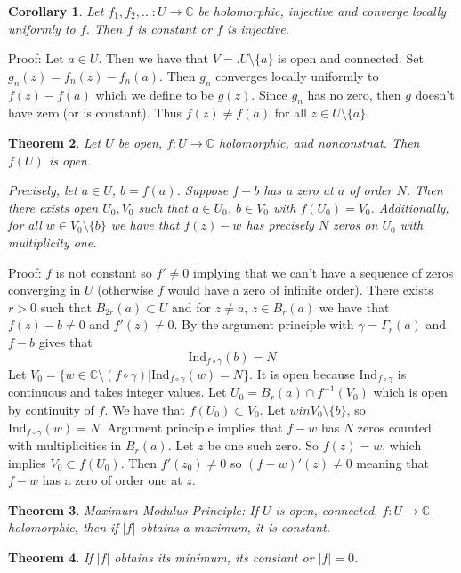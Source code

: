 \documentclass[11pt]{article}
\theoremstyle{plain}
\newtheorem{theorem}{Theorem}[section]
\newtheorem{corollary}[theorem]{Corollary}
\theoremstyle{definition}
\newcommand{\C}{\mathbb{C}}
\newcommand{\Ind}{\text{Ind}}
\begin{document}
\begin{corollary}
Let $f_1, f_2, ... : U \to \C$ be holomorphic, injective and converge locally uniformly to $f$. Then $f$ is constant or $f$ is injective.
\end{corollary}

Proof: Let $a \in U$. Then we have that $V =.U \setminus \{ a \}$ is open and connected. Set $g_n(z) = f_n(z) - f_n(a)$. Then $g_n$ converges locally uniformly to $f(z) - f(a)$ which we define to be $g(z)$. Since $g_n$ has no zero, then $g$ doesn't have zero (or is constant). Thus $f(z) \neq f(a)$ for all $z \in U \setminus \{ a \}$.

\begin{theorem}
Let $U$ be open, $f: U \to \C$ holomorphic, and nonconstnat. Then $f(U)$ is open.

Precisely, let $a \in U$, $b = f(a)$. Suppose $f - b$ has a zero at $a$ of order $N$. Then there exists open $U_0, V_0$ such that $a \in U_0$, $b \in V_0$ with $f(U_0) = V_0$. Additionally, for all $w \in V_0 \setminus \{ b\}$ we have that $f(z) - w$ has precisely $N$ zeros on $U_0$ with multiplicity one.
\end{theorem}

Proof: $f$ is not constant so $f' \neq 0$ implying that we can't have a sequence of zeros converging in $U$ (otherwise $f$ would have a zero of infinite order). There exists $r > 0$ such that $B_{2r}(a) \subset U$ and for $z \neq a$, $z \in B_r(a)$ we have that $f(z) - b \neq 0$ and $f'(z) \neq 0$. By the argument principle with $\gamma = \Gamma_r(a)$ and $f-b$ gives that 
$$ \Ind_{f\circ\gamma}(b) = N $$
Let $V_0 = \{ w \in \C \setminus (f \circ \gamma ) | \Ind_{f\circ\gamma}(w) = N\}$. It is open because $\Ind_{f\circ\gamma}$ is continuous and takes integer values. Let $U_0 = B_r(a) \cap f^{-1}(V_0)$ which is open by continuity of $f$. We have that $f(U_0) \subset V_0$. Let $w in V_0 \setminus \{ b\}$, so $\Ind_{f\circ\gamma}(w) = N$. Argument principle implies that $f-w$ has $N$ zeros counted with multiplicities in $B_r(a)$. Let $z$ be one such zero. So $f(z) = w$, which implies $V_0 \subset f(U_0)$. Then $f'(z_0) \neq 0$ so $(f-w)'(z) \neq 0$ meaning that $f-w$ has a zero of order one at $z$.

\begin{theorem}
Maximum Modulus Principle: If $U$ is open, connected, $f:U \to \C$ holomorphic, then if $|f|$ obtains a maximum, it is constant. 
\end{theorem}

\begin{theorem}
If $|f|$ obtains its minimum, its constant or $|f| = 0$.
\end{theorem}
\end{document}
